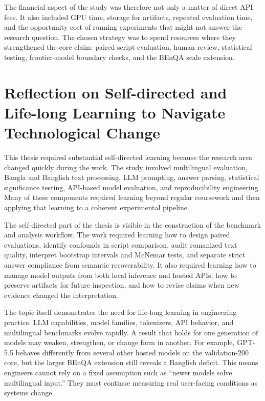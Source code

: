 The financial aspect of the study was therefore not only a matter of direct API fees. It also included GPU time, storage for artifacts, repeated evaluation time, and the opportunity cost of running experiments that might not answer the research question. The chosen strategy was to spend resources where they strengthened the core claim: paired script evaluation, human review, statistical testing, frontier-model boundary checks, and the BEnQA scale extension.

\section{Reflection on Self-directed and Life-long Learning to Navigate Technological Change}

This thesis required substantial self-directed learning because the research area changed quickly during the work. The study involved multilingual evaluation, Bangla and Banglish text processing, LLM prompting, answer parsing, statistical significance testing, API-based model evaluation, and reproducibility engineering. Many of these components required learning beyond regular coursework and then applying that learning to a coherent experimental pipeline.

The self-directed part of the thesis is visible in the construction of the benchmark and analysis workflow. The work required learning how to design paired evaluations, identify confounds in script comparison, audit romanized text quality, interpret bootstrap intervals and McNemar tests, and separate strict answer compliance from semantic recoverability. It also required learning how to manage model outputs from both local inference and hosted APIs, how to preserve artifacts for future inspection, and how to revise claims when new evidence changed the interpretation.

The topic itself demonstrates the need for life-long learning in engineering practice. LLM capabilities, model families, tokenizers, API behavior, and multilingual benchmarks evolve rapidly. A result that holds for one generation of models may weaken, strengthen, or change form in another. For example, GPT-5.5 behaves differently from several other hosted models on the validation-200 core, but the larger BEnQA extension still reveals a Banglish deficit. This means engineers cannot rely on a fixed assumption such as ``newer models solve multilingual input.'' They must continue measuring real user-facing conditions as systems change.

